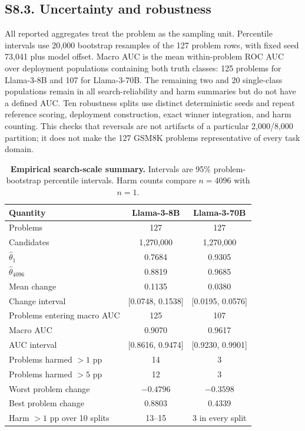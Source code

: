 \documentclass[10pt,twocolumn]{article}
\begin{document}
\subsection*{S8.3. Uncertainty and robustness}

All reported aggregates treat the problem as the sampling unit. Percentile intervals use 20,000 bootstrap resamples of the 127 problem rows, with fixed seed 73,041 plus model offset. Macro AUC is the mean within-problem ROC AUC over deployment populations containing both truth classes: 125 problems for Llama-3-8B and 107 for Llama-3-70B. The remaining two and 20 single-class populations remain in all search-reliability and harm summaries but do not have a defined AUC. Ten robustness splits use distinct deterministic seeds and repeat reference scoring, deployment construction, exact winner integration, and harm counting. This checks that reversals are not artifacts of a particular 2,000/8,000 partition; it does not make the 127 GSM8K problems representative of every task domain.

\begin{table}[h]
\centering
\caption{\textbf{Empirical search-scale summary.} Intervals are 95\% problem-bootstrap percentile intervals. Harm counts compare $n=4096$ with $n=1$.}
\label{si:tab:empirical-summary}
\begin{tabular}{lcc}
\toprule
Quantity & Llama-3-8B & Llama-3-70B \\
\midrule
Problems & 127 & 127 \\
Candidates & 1,270,000 & 1,270,000 \\
$\widehat\theta_1$ & 0.7684 & 0.9305 \\
$\widehat\theta_{4096}$ & 0.8819 & 0.9685 \\
Mean change & 0.1135 & 0.0380 \\
Change interval & [0.0748, 0.1538] & [0.0195, 0.0576] \\
Problems entering macro AUC & 125 & 107 \\
Macro AUC & 0.9070 & 0.9617 \\
AUC interval & [0.8616, 0.9474] & [0.9230, 0.9901] \\
Problems harmed $>1$ pp & 14 & 3 \\
Problems harmed $>5$ pp & 12 & 3 \\
Worst problem change & $-0.4796$ & $-0.3598$ \\
Best problem change & 0.8803 & 0.4339 \\
Harm $>1$ pp over 10 splits & 13--15 & 3 in every split \\
\bottomrule
\end{tabular}
\end{table}
\end{document}
